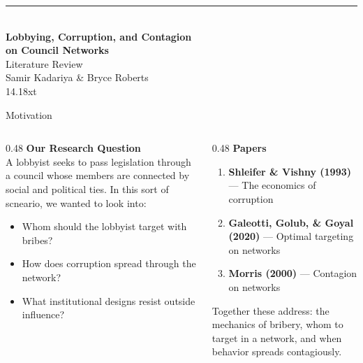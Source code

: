 \documentclass[aspectratio=169]{beamer}
\title{}
\author{}
\date{}
\newcommand{\accentline}{\vspace{1pt}{\color{accent}\rule{0.3\textwidth}{1.5pt}}\vspace{4pt}}
\begin{document}
\begin{frame}[plain]
    \vspace{1.8cm}
    \begin{center}
        {\color{accent}\rule{0.5\textwidth}{1.5pt}}\\[10pt]
        {\LARGE\bfseries\color{darktext} Lobbying, Corruption, and Contagion\\[4pt] on Council Networks}\\[10pt]
        {\large\color{accentblue} Literature Review}\\[20pt]
        {\color{midgray} Samir Kadariya \& Bryce Roberts}\\[4pt]
        {\small\color{lightgray} 14.18xt }
    \end{center}
\end{frame}

\begin{frame}{Motivation}
\accentline
\begin{columns}[T]
    \begin{column}{0.48\textwidth}
        {\color{accent}\bfseries Our Research Question}\\[4pt]
        {\small A lobbyist seeks to pass legislation through a council whose members are connected by social and political ties. In this sort of scneario, we wanted to look into:}
        \begin{itemize}\small
            \item Whom should the lobbyist target with bribes?
            \item How does corruption spread through the network?
            \item What institutional designs resist outside influence?
        \end{itemize}
    \end{column}
    \begin{column}{0.48\textwidth}
        {\color{accent}\bfseries Papers}\\[4pt]
        \begin{enumerate}\small
            \item {\color{accentred}\bfseries Shleifer \& Vishny (1993)} --- The economics of corruption
            \item {\color{accentgreen}\bfseries Galeotti, Golub, \& Goyal (2020)} --- Optimal targeting on networks
            \item {\color{accentteal}\bfseries Morris (2000)} --- Contagion on networks
        \end{enumerate}
        \vspace{6pt}
        {\small\color{midgray} Together these address: the mechanics of bribery, whom to target in a network, and when behavior spreads contagiously.}
    \end{column}
\end{columns}
\end{frame}
\end{document}
